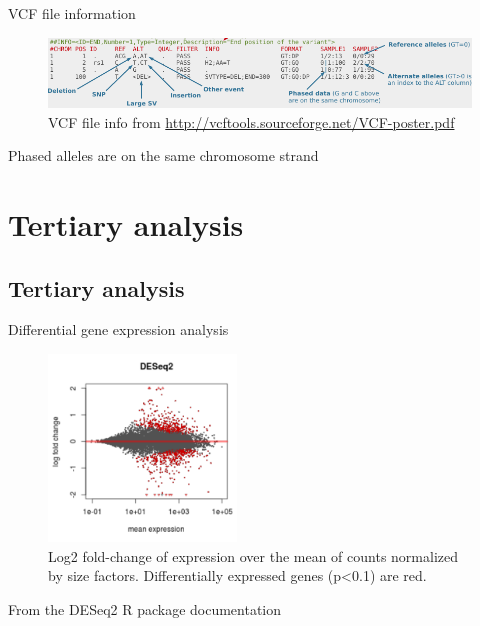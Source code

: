 \documentclass[presentation]{beamer}
\begin{document}
\begin{frame}[label=sec-3-1-15]{VCF file information}
\begin{center}

\begin{figure}[htb]
\centering
\includegraphics[width=11.5cm]{DanecekVcfFile2.png}
\caption{VCF file info from \url{http://vcftools.sourceforge.net/VCF-poster.pdf}}
\end{figure}

Phased alleles are on the same chromosome strand
 \end{center}
\end{frame}
\section{Tertiary analysis}
\label{sec-4}
\subsection{Tertiary analysis}
\label{sec-4-1}
\begin{frame}[label=sec-4-1-1]{Differential gene expression analysis}

\begin{center}
\begin{figure}[htb]
\centering
\includegraphics[width=5cm]{MAplot_DESeq2.png}
\caption{Log2 fold-change of expression over the mean of counts normalized by size factors. Differentially expressed genes (p<0.1) are red.}
\end{figure}

\tiny{From the DESeq2 R package documentation}
\end{center}
\end{frame}
\end{document}
